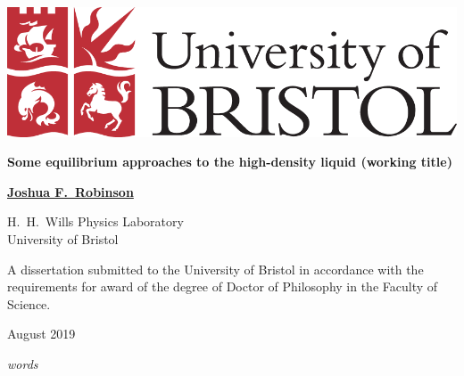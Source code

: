 \documentclass[11pt,twoside]{report}
\begin{document}

\thispagestyle{empty}
\begin{center}
  \begin{minipage}{0.8\linewidth}
    \centering
    \vspace{1cm}
    \includegraphics[width=0.6\linewidth]{bristol-logo}\par
    \vspace{2cm}
    {\Large \textbf{Some equilibrium approaches to the high-density liquid (working title)} \par}
    \vspace{2cm}
    {\Large \textbf{\href{mailto:joshua.robinson@bristol.ac.uk}{Joshua F.\ Robinson}} \par}
    \vspace{3cm}
    {\large H.\ H.\ Wills Physics Laboratory \\ University of Bristol \par}
    \vspace{2cm}
   {\large A dissertation submitted to the University of Bristol in accordance with the requirements for award of the degree of Doctor of Philosophy in the Faculty of Science. \par}
    \vspace{2cm}
    {\large August 2019 \par}
    \vspace{2cm}
    \raggedleft
    {\large \emph{ words}}
\end{minipage}
\end{center}

\cleardoublepage
\cleardoublepage
\cleardoublepage
\cleardoublepage
\cleardoublepage

\cleardoublepage\tableofcontents
\cleardoublepage\listoffigures
\cleardoublepage\listoftodos

\restoregeometry

\setcounter{page}{1}








\begin{appendices}
  
  
\end{appendices}

\printbibliography
\end{document}
